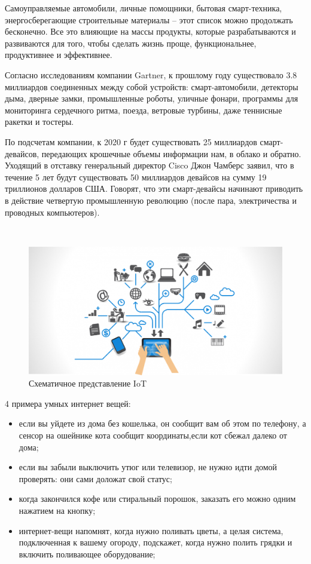 Самоуправляемые автомобили, личные помощники, бытовая смарт-техника, энергосберегающие строительные материалы – этот список можно продолжать бесконечно. Все это влияющие на массы продукты, которые разрабатываются и развиваются для того, чтобы сделать жизнь проще, функциональнее, продуктивнее и эффективнее.

Согласно исследованиям компании Gartner, к прошлому году существовало 3.8 миллиардов соединенных между собой устройств: смарт-автомобили, детекторы дыма, дверные замки, промышленные роботы, уличные фонари, программы для мониторинга сердечного ритма, поезда, ветровые турбины, даже теннисные ракетки и тостеры.

По подсчетам компании, к 2020 г будет существовать 25 миллиардов смарт-девайсов, передающих крошечные объемы информации нам, в облако и обратно. Уходящий в отставку генеральный директор Cisco Джон Чамберс заявил, что в течение 5 лет будут существовать 50 миллиардов девайсов на сумму 19 триллионов долларов США. Говорят, что эти смарт-девайсы начинают приводить в действие четвертую промышленную революцию (после пара, электричества и проводных компьютеров).

~
\begin{figure}[H]
\centering
	\includegraphics[scale=0.4]{figures/iot_scheme.png}
	\caption{Схематичное представление IoT}
	\label{fig:subject:iot:scheme}
\end{figure}

4 примера умных интернет вещей:
\begin{itemize}
	\item если вы уйдете из дома без кошелька, он сообщит вам об этом по телефону, а сенсор на ошейнике кота сообщит координаты,если кот сбежал далеко от дома;
	\item если вы забыли выключить утюг или телевизор, не нужно идти домой проверять: они сами доложат свой статус;
	\item когда закончился кофе или стиральный порошок, заказать его можно одним нажатием на кнопку;
	\item интернет-вещи напомнят, когда нужно поливать цветы, а целая система, подключенная к вашему огороду, подскажет, когда нужно полить грядки и включить поливающее оборудование;
\end{itemize}

